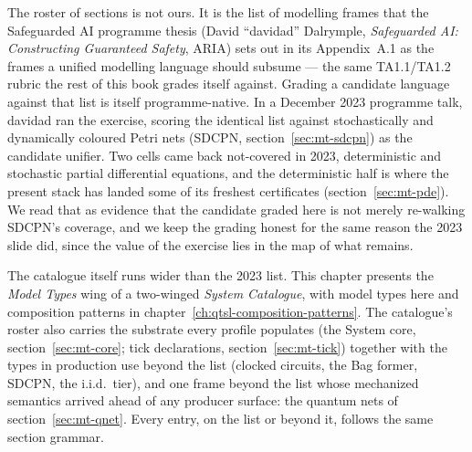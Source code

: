 The roster of sections is not ours. It is the list of modelling
frames that the Safeguarded AI programme thesis (David ``davidad''
Dalrymple, \emph{Safeguarded AI: Constructing Guaranteed Safety},
ARIA) \cite{dalrymple-sgai-thesis} sets out in its Appendix~A.1 as
the frames a unified modelling language should subsume --- the same
TA1.1/TA1.2 rubric the rest of this book grades itself against. Grading a candidate language against
that list is itself programme-native. In a December 2023 programme
talk, davidad ran the exercise, scoring the identical list against
stochastically and dynamically coloured Petri nets
(SDCPN, section~\ref{sec:mt-sdcpn}) as the candidate unifier. Two
cells came back not-covered in 2023, deterministic and stochastic
partial differential equations, and the deterministic half is where
the present stack has landed some of its freshest certificates
(section~\ref{sec:mt-pde}). We read that as evidence that the
candidate graded here is not merely re-walking SDCPN's coverage, and
we keep the grading honest for the same reason the 2023 slide did,
since the value of the exercise lies in the map of what remains.

The catalogue itself runs wider than the 2023 list. This chapter
presents the \emph{Model Types} wing of a two-winged \emph{System
Catalogue}, with model types here and composition patterns in
chapter~\ref{ch:qtsl-composition-patterns}. The catalogue's roster
also carries the substrate every profile populates (the System core,
section~\ref{sec:mt-core}; tick declarations,
section~\ref{sec:mt-tick}) together with the types in production use
beyond the list (clocked circuits, the Bag former, SDCPN, the i.i.d.\
tier), and one frame beyond the list whose mechanized semantics
arrived ahead of any producer surface: the quantum nets of
section~\ref{sec:mt-qnet}. Every entry, on the list or beyond it,
follows the same section grammar.

